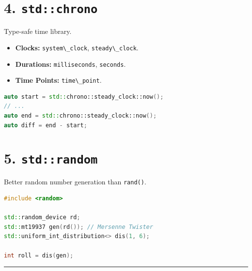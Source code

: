 \hypertarget{stdchrono}{%
\section{\texorpdfstring{4.
\texttt{std::chrono}}{4. std::chrono}}\label{stdchrono}}

Type-safe time library.

\begin{itemize}
\tightlist
\item
  \textbf{Clocks:} \passthrough{\lstinline!system\_clock!},
  \passthrough{\lstinline!steady\_clock!}.
\item
  \textbf{Durations:} \passthrough{\lstinline!milliseconds!},
  \passthrough{\lstinline!seconds!}.
\item
  \textbf{Time Points:} \passthrough{\lstinline!time\_point!}.
\end{itemize}

\begin{lstlisting}[language={C++}]
auto start = std::chrono::steady_clock::now();
// ...
auto end = std::chrono::steady_clock::now();
auto diff = end - start;
\end{lstlisting}

\hypertarget{stdrandom}{%
\section{\texorpdfstring{5.
\texttt{std::random}}{5. std::random}}\label{stdrandom}}

Better random number generation than \passthrough{\lstinline!rand()!}.

\begin{lstlisting}[language={C++}]
#include <random>

std::random_device rd;
std::mt19937 gen(rd()); // Mersenne Twister
std::uniform_int_distribution<> dis(1, 6);

int roll = dis(gen);
\end{lstlisting}

\begin{center}\rule{0.5\linewidth}{0.5pt}\end{center}
